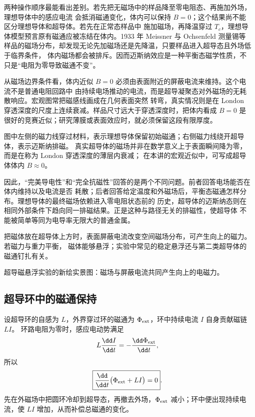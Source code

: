两种操作顺序最能看出差别。若先把无磁场中的样品降至零电阻态、再施加外场，理想导体中的感应电流
会抵消磁通变化，体内可以保持 $B=0$；这个结果尚不能区分理想导体和超导体。若先在正常态样品中
施加磁场，再降温穿过 $T_c$，理想导体模型预言原有磁通应被冻结在体内。1933 年 Meissner 与 Ochsenfeld
测量锡等样品的磁场分布，却发现无论先加磁场还是先降温，只要样品进入超导态且外场低于临界条件，
体内磁场都会被排斥。因而迈斯纳效应是一种平衡态磁学性质，不只是“电阻为零导致磁通不变”。

从磁场边界条件看，体内近似 $B=0$ 必须由表面附近的屏蔽电流来维持。这个电流不是普通电阻回路中
由持续电场推动的电流，而是超导凝聚态对外磁场的无耗散响应。宏观图常把磁感线画成在几何表面突然
转弯，真实情况则是在 London 穿透深度的尺度上连续衰减。样品尺寸远大于穿透深度时，把体内看成
$B=0$ 是很好的竞赛近似；研究薄膜或表面效应时，就必须保留这段有限厚度。

\meissnerComparisonDiagram

图中左侧的磁力线穿过材料，表示理想导体保留初始磁通；右侧磁力线绕开超导体，表示迈斯纳排磁。
真实超导体的磁场并非在数学意义上于表面瞬间降为零，而是在称为 London 穿透深度的薄层内衰减；
在本讲的宏观近似中，可写成超导体体内 $B\approx0$。

因此，“完美导电性”和“完全抗磁性”回答的是两个不同问题。前者回答电场能否在体内维持以及电流是否
耗散；后者回答给定温度和外磁场后，平衡态磁通怎样分布。理想导体的最终磁场依赖进入零电阻状态前的
历史，超导体的迈斯纳态则在相同外部条件下趋向同一排磁结果。正是这种与路径无关的排磁性，使超导体
不能被简单等同为电导率无限大的普通金属。

把磁体放在超导体上方时，表面屏蔽电流改变空间磁场分布，可产生向上的磁力。若磁力与重力平衡，
磁体能够悬浮；实验中常见的稳定悬浮还与第二类超导体的磁通钉扎有关。

\levitationDiagram

%
{超导磁悬浮实验的新绘实景图：磁场与屏蔽电流共同产生向上的电磁力。}

\subsection*{超导环中的磁通保持}

设超导环的自感为 $L$，外界穿过环的磁通为 $\Phi_{\rm ext}$，环中持续电流 $I$ 自身贡献磁链 $LI$。
环路电阻为零时，感应电动势满足
\begin{equation}
  L\frac{\dd I}{\dd t}=-\frac{\dd\Phi_{\rm ext}}{\dd t},
\end{equation}
所以
\begin{equation}
  \boxed{\frac{\dd}{\dd t}\bigl(\Phi_{\rm ext}+LI\bigr)=0}.
\end{equation}
先在外磁场中把圆环冷却到超导态，再撤去外场，$\Phi_{\rm ext}$ 减小；环中便出现持续电流，使 $LI$
增加，从而补偿总磁通的变化。

